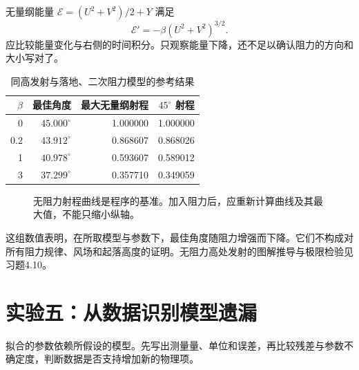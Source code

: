 \documentclass[11pt,openany,fontset=fandol]{ctexbook}
\theoremstyle{plain}\newtheorem{theorem}{定理}[chapter]\newtheorem{proposition}[theorem]{命题}
\theoremstyle{definition}\newtheorem{definition}{定义}[chapter]\newtheorem{example}{例}[chapter]
\theoremstyle{remark}\newtheorem*{remark}{说明}
\begin{document}
无量纲能量 $\mathcal E=(U^2+V^2)/2+Y$ 满足
\[
\mathcal E'=-\beta(U^2+V^2)^{3/2}.
\]
应比较能量变化与右侧的时间积分。只观察能量下降，还不足以确认阻力的方向和大小写对了。

\begin{table}[htbp]\centering\caption{同高发射与落地、二次阻力模型的参考结果}
\begin{tabular}{rrrr}\toprule
$\beta$ & 最佳角度 & 最大无量纲射程 & $45^\circ$ 射程\\\midrule
0&$45.000^\circ$&1.000000&1.000000\\
0.2&$43.912^\circ$&0.868607&0.868026\\
1&$40.978^\circ$&0.593607&0.589012\\
3&$37.299^\circ$&0.357710&0.349059\\\bottomrule
\end{tabular}\end{table}

\begin{figure}[htbp]\centering
{}
\caption{无阻力射程曲线是程序的基准。加入阻力后，应重新计算曲线及其最大值，不能只缩小纵轴。}
\label{fig:orig-089}
\end{figure}

这组数值表明，在所取模型与参数下，最佳角度随阻力增强而下降。它们不构成对所有阻力规律、风场和起落高度的证明。无阻力高处发射的图解推导与极限检验见习题4.10。

\section{实验五：从数据识别模型遗漏}
拟合的参数依赖所假设的模型。先写出测量量、单位和误差，再比较残差与参数不确定度，判断数据是否支持增加新的物理项。
\end{document}
